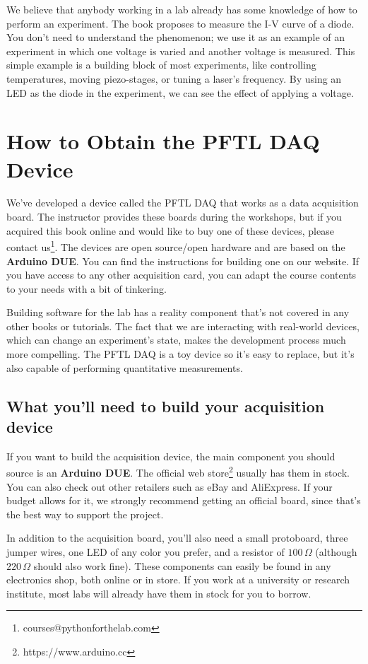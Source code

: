 We believe that anybody working in a lab already has some knowledge of how to perform an experiment. The book proposes to measure the I-V curve of a diode. You don't need to understand the phenomenon; we use it as an example of an experiment in which one voltage is varied and another voltage is measured. This simple example is a building block of most experiments, like controlling temperatures, moving piezo-stages, or tuning a laser's frequency. By using an LED as the diode in the experiment, we can see the effect of applying a voltage.

\section{How to Obtain the PFTL DAQ Device}\label{sec:pftl-daq-device}
We've developed a device called the {PFTL DAQ} that works as a data acquisition board. The instructor provides these boards during the workshops, but if you acquired this book online and would like to buy one of these devices, please contact us\footnote{courses@pythonforthelab.com}. The devices are open source/open hardware and are based on the \textbf{Arduino DUE}. You can find the instructions for building one on our website. If you have access to any other acquisition card, you can adapt the course contents to your needs with a bit of tinkering.

Building software for the lab has a reality component that's not covered in any other books or tutorials. The fact that we are interacting with real-world devices, which can change an experiment's state, makes the development process much more compelling. The PFTL DAQ is a toy device so it's easy to replace, but it's also capable of performing quantitative measurements.

\subsection{What you'll need to build your acquisition device}
If you want to build the acquisition device, the main component you should source is an \textbf{Arduino DUE}. The official web store\footnote{https://www.arduino.cc} usually has them in stock. You can also check out other retailers such as eBay and AliExpress. If your budget allows for it, we strongly recommend getting an official board, since that's the best way to support the project.

In addition to the acquisition board, you'll also need a small protoboard, three jumper wires, one LED of any color you prefer, and a resistor of $100\,\Omega$ (although $220\,\Omega$ should also work fine). These components can easily be found in any electronics shop, both online or in store. If you work at a university or research institute, most labs will already have them in stock for you to borrow.

